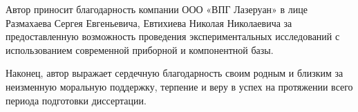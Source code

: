 Автор приносит благодарность компании ООО «ВПГ Лазеруан» в лице  Размахаева Сергея Евгеньевича, Евтихиева Николая Николаевича за предоставленную возможность проведения экспериментальных исследований с использованием современной приборной и компонентной базы.

Наконец, автор выражает сердечную благодарность своим родным и близким за неизменную моральную поддержку, терпение и веру в успех на протяжении всего периода подготовки диссертации.

